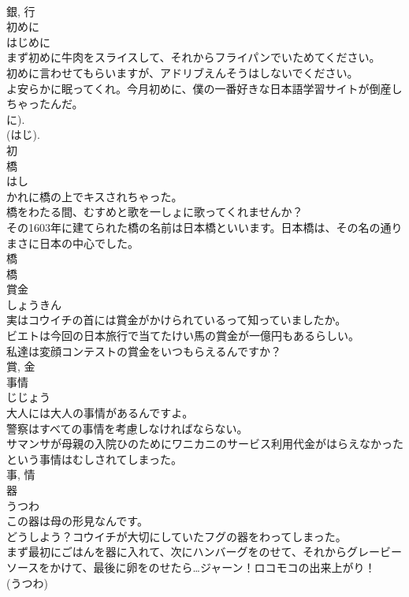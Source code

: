 \documentclass[8pt]{extreport}
\begin{document}
\begin{CJK}{UTF8}{min}
\\	銀, 行	
\\	初めに	
\\	はじめに	
\\	まず初めに牛肉をスライスして、それからフライパンでいためてください。	
\\	初めに言わせてもらいますが、アドリブえんそうはしないでください。	
\\	よ安らかに眠ってくれ。今月初めに、僕の一番好きな日本語学習サイトが倒産しちゃったんだ。	
\\	に). 
\\	(はじ). 
\\	初	
\\	橋	
\\	はし	
\\	かれに橋の上でキスされちゃった。	
\\	橋をわたる間、むすめと歌を一しょに歌ってくれませんか？	
\\	その1603年に建てられた橋の名前は日本橋といいます。日本橋は、その名の通りまさに日本の中心でした。	
\\	橋
\\	橋	
\\	賞金	
\\	しょうきん	
\\	実はコウイチの首には賞金がかけられているって知っていましたか。	
\\	ビエトは今回の日本旅行で当てたけい馬の賞金が一億円もあるらしい。	
\\	私達は変顔コンテストの賞金をいつもらえるんですか？	
\\	賞, 金	
\\	事情	
\\	じじょう	
\\	大人には大人の事情があるんですよ。	
\\	警察はすべての事情を考慮しなければならない。	
\\	サマンサが母親の入院ひのためにワニカニのサービス利用代金がはらえなかったという事情はむしされてしまった。	
\\	事, 情	
\\	器	
\\	うつわ	
\\	この器は母の形見なんです。	
\\	どうしよう？コウイチが大切にしていたフグの器をわってしまった。	
\\	まず最初にごはんを器に入れて、次にハンバーグをのせて、それからグレービーソースをかけて、最後に卵をのせたら…ジャーン！ロコモコの出来上がり！	
\\	(うつわ) 

\end{CJK}
\end{document}
